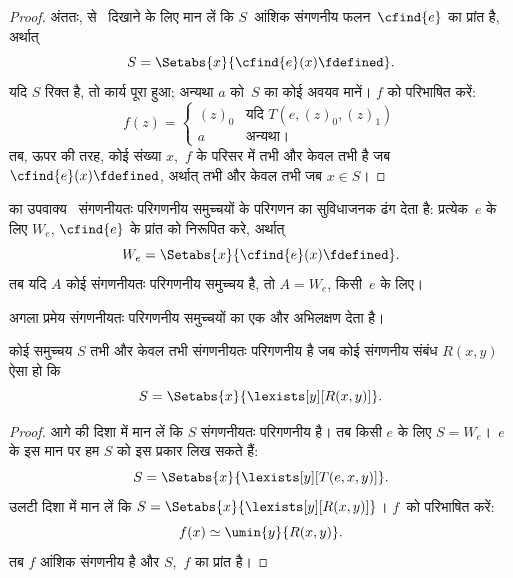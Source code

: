 \documentclass[../../../include/open-logic-section]{subfiles}
\begin{document}
\begin{proof}
अंततः,  से~ दिखाने के लिए मान लें
कि $S$~आंशिक संगणनीय फलन~$\cfind{e}$ का प्रांत है, अर्थात्
\[
S = \Setabs{x}{\cfind{e}(x) \fdefined}.
\]
यदि $S$ रिक्त है, तो कार्य पूरा हुआ; अन्यथा $a$ को~$S$ का कोई अवयव मानें।
$f$ को परिभाषित करें:
\[
f(z) = \begin{cases}
(z)_0 & \text{यदि $T(e,(z)_0,(z)_1)$} \\
a & \text{अन्यथा।}
\end{cases}
\]
तब, ऊपर की तरह, कोई संख्या $x$,~$f$ के परिसर में तभी और केवल तभी है जब
$\cfind{e}(x) \fdefined$, अर्थात् तभी और केवल तभी जब $x \in S$।
\end{proof}

 का उपवाक्य~ संगणनीयतः
परिगणनीय समुच्चयों के परिगणन का सुविधाजनक ढंग देता है: प्रत्येक~$e$ के
लिए $W_e$, $\cfind{e}$ के प्रांत को निरूपित करे, अर्थात्
\[
W_e = \Setabs{x}{\cfind{e}(x) \fdefined}.
\] 
तब यदि $A$ कोई संगणनीयतः परिगणनीय समुच्चय है, तो $A = W_e$, किसी~$e$ के लिए।

अगला प्रमेय संगणनीयतः परिगणनीय समुच्चयों का एक और अभिलक्षण देता है।

\begin{thm}
कोई समुच्चय $S$ तभी और केवल तभी संगणनीयतः परिगणनीय है जब कोई संगणनीय
संबंध $R(x,y)$ ऐसा हो कि
\[
S = \Setabs{ x }{ \lexists[y][R(x,y)] }.
\]
\end{thm}

\begin{proof}
आगे की दिशा में मान लें कि $S$ संगणनीयतः परिगणनीय है। तब किसी $e$ के
लिए $S = W_e$।~$e$ के इस मान पर हम $S$ को इस प्रकार लिख सकते हैं:
\[
S = \Setabs{ x }{ \lexists[y][T(e, x, y)] }.
\]
उलटी दिशा में मान लें कि $S = \Setabs{ x }{
  \lexists[y][R(x, y)] }$। $f$~को परिभाषित करें:
\[
f(x) \simeq \umin{y}{R(x, y)}.
\]
तब $f$ आंशिक संगणनीय है और $S$,~$f$ का प्रांत है।
\end{proof}
\end{document}
